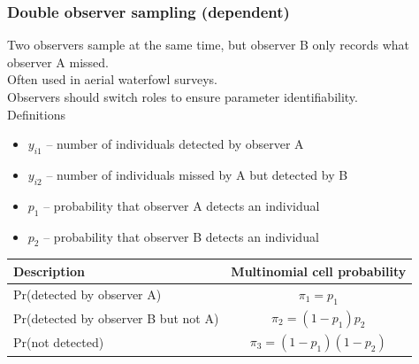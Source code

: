 \documentclass[color=usenames,dvipsnames]{beamer}\usepackage[]{graphicx}\usepackage[]{color}
\begin{document}
\begin{frame}
  \frametitle{Double observer sampling (dependent)}
  \small
  Two observers sample at the same time, but observer B only records
  what observer A missed. \\
  \pause
  \vfill
  Often used in aerial waterfowl surveys. \\
  \pause
  \vfill
  Observers should switch roles to ensure parameter identifiability. \\
  \pause
  \vfill
  Definitions
  \begin{itemize}
    \setlength\itemsep{1pt}
    \item $y_{i1}$ -- number of individuals detected by observer A
    \item $y_{i2}$ -- number of individuals missed by A but
      detected by B
    \item $p_1$ -- probability that observer A detects an individual 
    \item $p_2$ -- probability that observer B detects an individual 
  \end{itemize}
  \pause \vfill
  \footnotesize
  \begin{tabular}{lc}
    \hline
    \centering
    Description & Multinomial cell probability \\
    \hline
    Pr(detected by observer A) & $\pi_1 = p_1$ \\
    Pr(detected by observer B but not A) & $\pi_2 = (1-p_1)p_2$ \\
    Pr(not detected) & $\pi_3 = (1-p_1)(1-p_2)$ \\
    \hline
  \end{tabular}
\end{frame}






\end{document}
